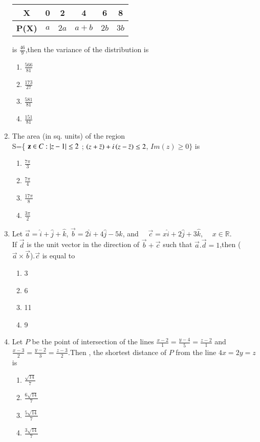 \documentclass[journal,12pt,onecolumn]{IEEEtran}
\theoremstyle{remark}
\begin{document}
\begin{enumerate}
\begin{tabular}[12pt]{ |c| c| c| c| c| c|}
    \hline
    \textbf{X} & 0 & 2 & 4 & 6 & 8 \\ 
    \hline
    \textbf{P(X)} & $a$ & $2a$ & $a+b$ & $2b$ & $3b$ \\
    \hline   
    \end{tabular}

is $\frac{46}{9}$,then the variance of the distribution is \\
\begin{enumerate}
\item $\frac{566}{81}$
\item  $\frac{173}{27}$
\item $\frac{581}{81}$
\item $\frac{151}{81}$
\end{enumerate}
\item The area (in sq. units) of the region \\
S=\{ $\mathbf{z} \in C:\left\vert z - 1\right\vert \leq 2$ ; $\left(z + \bar{z}\right) + i\left(z - \bar{z}\right) \leq 2$, $Im(z) \geq 0 \}$ is
\begin{enumerate}
\item $\frac{7\pi}{3}$
\item $\frac{7\pi}{4}$
\item $\frac{17\pi}{8}$
\item $\frac{3\pi}{2}$
\end{enumerate}

\item Let $\vec{a} = \hat{i} + \hat{j} + \hat{k}$, $\vec{b} = 2\hat{i} + 4\hat{j} - 5\hat{k}$, and $\quad \vec{c} = x\hat{i} + 2\hat{j} + 3\hat{k}$, $\quad x \in \mathbb{R}$. \\
If $\vec{d}$  is the unit vector in the direction of  $\vec{b} + \vec{c}$ such that $ \vec{a}.\vec{d} = 1$,then ($\vec{a} \times \vec{b}$).$\vec{c}$ is equal to 
\begin{enumerate}
\item 3
\item 6
\item 11
\item 9
\end{enumerate}



\item Let $P$ be the point of intersection of the lines $\frac{x-2}{1}=\frac{y-4}{5}=\frac{z-2}{1}$ and $\frac{x-3}{2}=\frac{y-2}{3}=\frac{z-3}{2}$.Then , the shortest distance of $P$ from the line $4x=2y=z$ is
\begin{enumerate}
\item $\frac{\sqrt{14}}{7}$
\item  $\frac{6\sqrt{14}}{7}$
\item $\frac{5\sqrt{14}}{7}$
\item $\frac{3\sqrt{14}}{7}$
\end{enumerate}


\end{enumerate}
\end{document}
